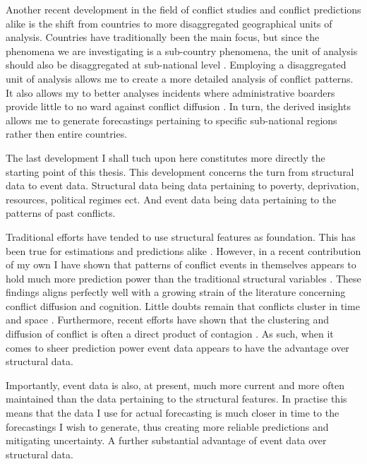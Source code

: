 \documentclass[a4paper]{article}
\begin{document}
Another recent development in the field of conflict studies and conflict predictions alike is the shift from countries to more disaggregated geographical units of analysis. Countries have traditionally been the main focus, but since the phenomena we are investigating is a sub-country phenomena, the unit of analysis should also be disaggregated at sub-national level \citep[490]{Cederman_Gleditsch_2009}. Employing a disaggregated unit of analysis allows me to create a more detailed analysis of conflict patterns. It also allows my to better analyses incidents where administrative boarders provide little to no ward against conflict diffusion \citep[445-446]{ol2010afghanistan}. In turn, the derived insights allows me to generate forecastings pertaining to specific sub-national regions rather then entire countries.\par

The last development I shall tuch upon here constitutes more directly the starting point of this thesis. This development concerns the turn from structural data to event data. Structural data being data pertaining to poverty, deprivation, resources, political regimes ect. And event data being data pertaining to the patterns of past conflicts.\par 

Traditional efforts have tended to use structural features as foundation. This has been true for estimations and predictions alike \cite[10]{chadefaux2017conflict}. However, in a recent contribution of my own I have shown that patterns of conflict events in themselves appears to hold much more prediction power than the traditional structural variables \citep{Maase}. These findings aligns perfectly well with a growing strain of the literature concerning conflict diffusion and cognition. Little doubts remain that conflicts cluster in time and space \citep[15]{crost2015conflict}. Furthermore, recent efforts have shown that the clustering and diffusion of conflict is often a direct product of contagion \citep{buhaug2008contagion,schutte2011diffusion,crost2015conflict,bara_2017}. As such, when it comes to sheer prediction power event data appears to have the advantage over structural data. 

Importantly, event data is also, at present, much more current and more often maintained than the data pertaining to the structural features. In practise this means that the data I use for actual forecasting is much closer in time to the forecastings I wish to generate, thus creating more reliable predictions and mitigating uncertainty. A further substantial advantage of event data over structural data.\par
\end{document}
